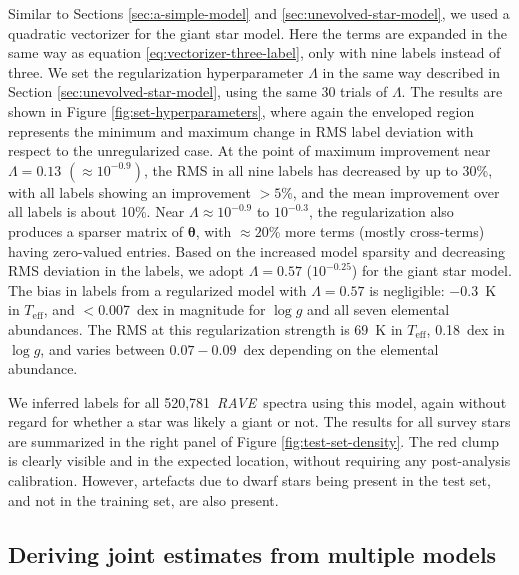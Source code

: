 \documentclass[preprint]{aastex}
\newcommand{\acronym}[1]{{\small{#1}}}
\newcommand{\project}[1]{\textsl{#1}}
\newcommand{\rave}{\project{\acronym{RAVE}}}
\newcommand{\teff}{T_{\mathrm{eff}}}
\newcommand{\logg}{\log g}
\newcommand{\Nspectra}{520,781}
\newcommand{\Dvector}[1]{\boldsymbol{#1}}
\newcommand{\vectheta}{\Dvector{\theta}}
\begin{document}
Similar to Sections \ref{sec:a-simple-model} and \ref{sec:unevolved-star-model},
we used a quadratic vectorizer for the giant star model.  Here the terms are 
expanded in the same way as equation \ref{eq:vectorizer-three-label}, only
with nine labels instead of three.  We set the regularization hyperparameter $\Lambda$
in the same way described in Section \ref{sec:unevolved-star-model}, using the same 30 trials of $\Lambda$.
The results are shown in Figure \ref{fig:set-hyperparameters}, where
again the enveloped region represents the minimum and maximum change in RMS label
deviation with respect to the unregularized case.  At the point of maximum improvement 
near $\Lambda = 0.13$ $(\approx10^{-0.9})$, the RMS in all nine labels has decreased by up to $30$\%,
with all labels showing an improvement $>5$\%, and the mean improvement over all labels is about 10\%.
Near $\Lambda \approx 10^{-0.9}$ to $10^{-0.3}$, the regularization also produces a sparser matrix
of $\vectheta$, with $\approx20$\% more terms (mostly cross-terms) having zero-valued entries.
Based on the increased model sparsity and decreasing RMS deviation in the labels, 
we adopt $\Lambda = 0.57$ ($10^{-0.25}$) for the giant star model.  The bias in 
labels from a regularized model with $\Lambda = 0.57$ is negligible: $-0.3$~K in 
$\teff$, and $<$0.007~dex in magnitude for $\logg$ and all seven elemental
abundances.  The RMS at this regularization strength is 69~K in $\teff$, 0.18~dex 
in $\logg$, and varies between $0.07-0.09$~dex depending on the elemental abundance.  


We inferred labels for all \Nspectra\ \rave\ spectra using this model, again without
regard for whether a star was likely a giant or not.  The results for all survey stars
are summarized in the right panel of Figure \ref{fig:test-set-density}.  The red clump
is clearly visible and in the expected location, without requiring any post-analysis 
calibration.  However, artefacts due to dwarf stars being present in the test set,
and not in the training set, are also present.


\subsection{Deriving joint estimates from multiple models}
\label{sec:joining-the-models}
\end{document}
